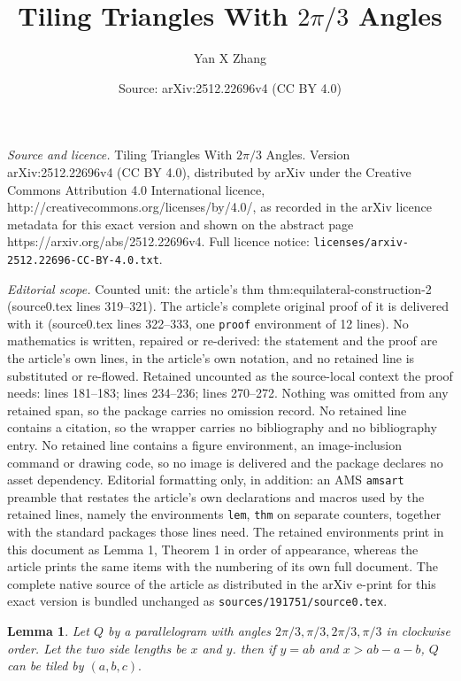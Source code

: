 \documentclass[10pt,a4paper]{amsart}
\title{Tiling Triangles With $2\pi/3$ Angles}
\author{Yan X Zhang}
\date{Source: arXiv:2512.22696v4 (CC BY 4.0)}
\newtheorem{lem}{Lemma}
\begin{document}
\maketitle

\noindent\emph{Source and licence.} Tiling Triangles With $2\pi/3$ Angles. Version arXiv:2512.22696v4 (CC BY 4.0), distributed by arXiv under the Creative Commons Attribution 4.0 International licence, http://creativecommons.org/licenses/by/4.0/, as recorded in the arXiv licence metadata for this exact version and shown on the abstract page https://arxiv.org/abs/2512.22696v4. Full licence notice: \texttt{licenses/arxiv-2512.22696-CC-BY-4.0.txt}.\par\smallskip

\noindent\textit{Editorial scope.} Counted unit: the article's thm thm:equilateral-construction-2 (source0.tex lines 319--321). The article's complete original proof of it is delivered with it (source0.tex lines 322--333, one \texttt{proof} environment of 12 lines). No mathematics is written, repaired or re-derived: the statement and the proof are the article's own lines, in the article's own notation, and no retained line is substituted or re-flowed.  Retained uncounted as the source-local context the proof needs: lines 181--183; lines 234--236; lines 270--272.  Nothing was omitted from any retained span, so the package carries no omission record.  No retained line contains a citation, so the wrapper carries no bibliography and no bibliography entry.  No retained line contains a figure environment, an image-inclusion command or drawing code, so no image is delivered and the package declares no asset dependency.  Editorial formatting only, in addition: an AMS \texttt{amsart} preamble that restates the article's own declarations and macros used by the retained lines, namely the environments \texttt{lem}, \texttt{thm} on separate counters, together with the standard packages those lines need.  The retained environments print in this document as Lemma 1, Theorem 1 in order of appearance, whereas the article prints the same items with the numbering of its own full document.  The complete native source of the article as distributed in the arXiv e-print for this exact version is bundled unchanged as \texttt{sources/191751/source0.tex}.
\begin{lem}
    \label{lem:parallelogram-1} Let $Q$ by a parallelogram with angles $2\pi/3, \pi/3, 2\pi/3, \pi/3$ in clockwise order. Let the two side lengths be $x$ and $y$. then if $y = ab$ and $x > ab-a-b$, $Q$ can be tiled by $(a,b,c).$
\end{lem}
\end{document}
